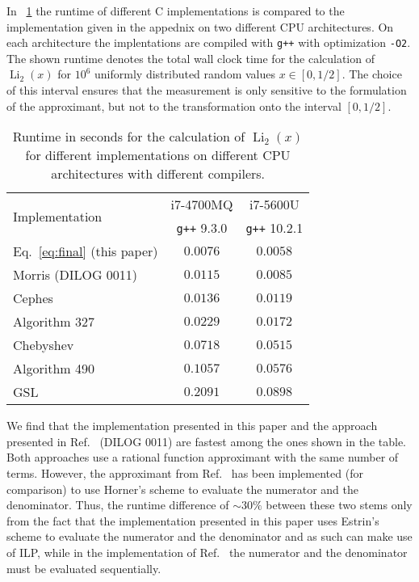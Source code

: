 \documentclass[10pt,DIV16,twocolumn,numbers=noenddot]{scrartcl}
\newcommand{\Li}{\operatorname{Li}_2}
\newcommand{\tabref}[1]{\tablename~\ref{#1}}
\begin{document}
In \tabref{tab:runtime} the runtime of different C implementations is
compared to the implementation given in the appednix on two different
CPU architectures.  On each architecture the implentations are
compiled with \texttt{g++} with optimization \texttt{-O2}.  The shown
runtime denotes the total wall clock time for the calculation of
$\Li(x)$ for $10^6$ uniformly distributed random values $x\in[0,1/2]$.
The choice of this interval ensures that the measurement is only
sensitive to the formulation of the approximant, but not to the
transformation onto the interval $[0,1/2]$.%
%
\begin{table}[tb]
  \centering
  \caption{Runtime in seconds for the calculation of $\Li(x)$ for
    different implementations on different CPU architectures with
    different compilers.}
  \begin{tabular}{lcc}
    \toprule
    \multirow{2}{*}{Implementation} & i7-4700MQ & i7-5600U \\
    & \texttt{g++} 9.3.0 & \texttt{g++} 10.2.1 \\
    \midrule
    Eq.~\eqref{eq:final} (this paper) & $0.0076$ & $0.0058$ \\
    Morris (DILOG 0011) \cite{morris} & $0.0115$ & $0.0085$ \\
    Cephes \cite{cephes}              & $0.0136$ & $0.0119$ \\
    Algorithm 327 \cite{koelbigDilog} & $0.0229$ & $0.0172$ \\
    Chebyshev \cite{luke}             & $0.0718$ & $0.0515$ \\
    Algorithm 490 \cite{ginsberg}     & $0.1057$ & $0.0576$ \\
    GSL \cite{gsl}                    & $0.2091$ & $0.0898$ \\
    \bottomrule
  \end{tabular}
  \label{tab:runtime}
\end{table}%

We find that the implementation presented in this paper and the
approach presented in Ref.~\cite{morris} (DILOG 0011) are fastest
among the ones shown in the table.  Both approaches use a rational
function approximant with the same number of terms.  However, the
approximant from Ref.~\cite{morris} has been implemented (for
comparison) to use Horner's scheme to evaluate the numerator and the
denominator.  Thus, the runtime difference of $\sim 30\%$ between
these two stems only from the fact that the implementation presented
in this paper uses Estrin's scheme to evaluate the numerator and the
denominator and as such can make use of ILP, while in the
implementation of Ref.~\cite{morris} the numerator and the denominator
must be evaluated sequentially.
\end{document}
